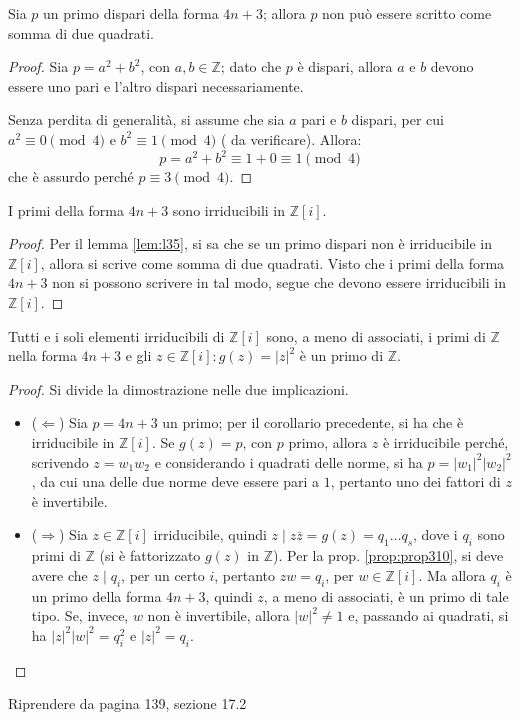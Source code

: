 \documentclass[11pt, a4paper]{scrartcl}
\theoremstyle{definition}
\numberwithin{esempio}{section}
\theoremstyle{definition}
\numberwithin{obs}{section}
\numberwithin{nota}{section}
\numberwithin{equation}{subsection}
\begin{document}
\begin{teorema}
	{}{}
	Sia $p$ un primo dispari della forma $4n +3$; allora $p$ non pu\`o essere scritto come somma di due quadrati.
	\begin{proof}
		Sia $p = a^2 + b^2$, con $a,b \in \mathbb{Z}$; dato che $p$ \`e dispari, allora $a$ e $b$ devono essere uno pari e l'altro dispari necessariamente.
		
		Senza perdita di generalit\`a, si assume che sia $a$ pari e $b $ dispari, per cui $a^2 \equiv 0 \pmod{4}$ e $b^2 \equiv 1 \pmod{4} $ ({\color{red} da verificare}). 
		Allora:
		\[
		p = a^2 + b^2 \equiv 1 + 0 \equiv 1 \pmod{4} 
		\] 
		che \`e assurdo perch\'e $p\equiv 3 \pmod{4} $.
	\end{proof}
\end{teorema}
\begin{corollario}
	{}{}
	I primi della forma $4n +3 $ sono irriducibili in $\mathbb{Z}[i]$.
	\begin{proof}
		Per il lemma \ref{lem:l35}, si sa che se un primo dispari non \`e irriducibile in $\mathbb{Z}[i]$, allora si scrive come somma di due quadrati.
		Visto che i primi della forma $4n + 3$ non si possono scrivere in tal modo, segue che devono essere irriducibili in $\mathbb{Z}[i]$.
	\end{proof}
\end{corollario}
\begin{teorema}
	{}{}
	Tutti e i soli elementi irriducibili di $\mathbb{Z}[i]$ sono, a meno di associati, i primi di $\mathbb{Z}$ nella forma $4n+3$ e gli $z \in \mathbb{Z}[i]: g(z) = \lvert z \rvert ^2$ \`e un primo di $\mathbb{Z}$.
	\begin{proof}
		Si divide la dimostrazione nelle due implicazioni.
		\begin{itemize}
			\item ($\Leftarrow$) Sia $p = 4n+3$ un primo; per il corollario precedente, si ha che \`e irriducibile in $\mathbb{Z}[i]$.
				Se $g(z) = p$, con $p$ primo, allora $z $ \`e irriducibile perch\'e, scrivendo $z = w_1w_2$ e considerando i quadrati delle norme, si ha $p = \lvert w_1 \rvert ^2 \lvert w_2 \rvert ^2$, da cui una delle due norme deve essere pari a $1$, pertanto uno dei fattori di $z$ \`e invertibile.
			\item ($\Rightarrow $) Sia $z \in \mathbb{Z}[i]$ irriducibile, quindi $z  \mid z \overline{z}= g(z) = q_1 \ldots q_s$, dove i $q_i$ sono primi di $\mathbb{Z}$ (si \`e fattorizzato $g(z)$ in $\mathbb{Z}$).
				Per la prop. \ref{prop:prop310}, si deve avere che $z  \mid q_i$, per un certo $i$, pertanto $zw = q_i$, per $w \in \mathbb{Z}[i]$.
				Ma allora $q_i$ \`e un primo della forma $4n + 3$, quindi $z$, a meno di associati, \`e un primo di tale tipo.
				Se, invece, $w$ non \`e invertibile, allora $\lvert w \rvert ^2 \neq 1$ e, passando ai quadrati, si ha $\lvert z \rvert ^2 \lvert w \rvert ^2 = q_i^2$ e $\lvert z \rvert ^2= q_i$.
		\end{itemize}
	\end{proof}
\end{teorema}
\begin{center}
	Riprendere da pagina 139, sezione 17.2
\end{center}
\end{document}
